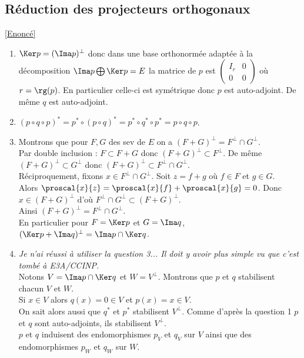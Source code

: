 \documentclass[8pt]{book}
\begin{document}
	\subsection{Réduction des projecteurs orthogonaux }
	\label{Réduction des projecteurs orthogonaux corrigé}
	\textcolor{blue}{\hyperref[Réduction des projecteurs orthogonaux]{[Enoncé]}}\\
	\begin{enumerate}[leftmargin=*]
		\item $\Ker p=(\Ima p)^\bot$ donc dans une base orthonormée adaptée à la décomposition $\Ima p\bigoplus \Ker p=E$ la matrice de $p$ est $\begin{pmatrix}
			I_r&0\\
			0&0
		\end{pmatrix}$ où $r=\rg(p)$. En particulier celle-ci est symétrique donc $p$ est auto-adjoint. De même $q$ est auto-adjoint.
		\item $(p\circ q\circ p)^*=p^*\circ (p\circ q)^*=p^*\circ q^*\circ p^*=p\circ q\circ p$.
		\item Montrons que pour $F,G$ des sev de $E$ on a $(F+G)^\bot=F^\bot\cap G^\bot$.\\
		Par double inclusion : $F\subset F+G$ donc $(F+G)^\bot\subset F^\bot$. De même $(F+G)^\bot \subset G^\bot$ donc $(F+G)^\bot\subset F^\bot\cap G^\bot$.\\
		Réciproquement, fixons $x\in F^\bot\cap G^\bot$. Soit $z=f+g$ où $f\in F$ et $g\in G$.\\
		Alors $\proscal{x}{z}=\proscal{x}{f}+\proscal{x}{g}=0$. Donc $x\in (F+G)^\bot$ d'où $F^\bot\cap G^\bot\subset (F+G)^\bot$.\\
		Ainsi $(F+G)^\bot=F^\bot\cap G^\bot$.\\
		En particulier pour $F=\Ker p$ et $G=\Ima q$, $(\Ker p+\Ima q)^\bot=\Ima p\cap\Ker q$.
		\item \textit{Je n'ai réussi à utiliser la question 3... Il doit y avoir plus simple vu que c'est tombé à E3A/CCINP.}\\
		Notons $V=\Ima p\cap\Ker q$ et $W=V^\bot$. Montrons que $p$ et $q$ stabilisent chacun $V$ et $W$.\\
		Si $x\in V$ alors $q(x)=0\in V$ et $p(x)=x\in V$.\\
		On sait alors aussi que $q^*$ et $p^*$ stabilisent $V^\bot$. Comme d'après la question 1 $p$ et $q$ sont auto-adjoints, ils stabilisent $V^\bot$.\\
		$p$ et $q$ induisent des endomorphismes $p_V$ et $q_V$ sur $V$ ainsi que des endomorphismes $p_W$ et $q_W$ sur $W$.\\

\end{enumerate}
\end{document}
